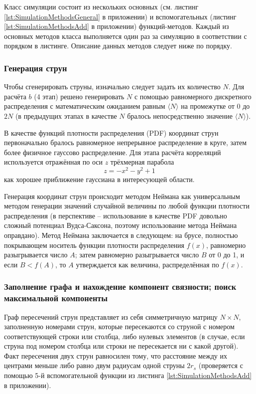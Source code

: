 Класс симуляции состоит из нескольких основных (см. листинг \ref{lst:SimulationMethodsGeneral} в приложении) и вспомогательных (листинг \ref{lst:SimulationMethodsAdd} в приложении) функций-методов. Каждый из основных методов класса выполняется один раз за симуляцию в соответствии с порядком в листинге. Описание данных методов следует ниже по порядку.
\subsubsection{Генерация струн}
Чтобы сгенерировать струны, изначально следует задать их количество $N$. Для расчёта $b$ (4 этап) решено генерировать $N$ с помощью равномерного дискретного распределения с математическим ожиданием равным $\langle N \rangle$ на промежутке от 0 до $2N$ (в предыдущих этапах в качестве $N$ бралось непосредственно значение $\langle N \rangle$). 

В качестве функций плотности распределения (PDF) координат струн первоначально бралось равномерное непрерывное распределение в круге, затем более физичное гауссово распределение. Для этапа расчёта корреляций используется отражённая по оси $z$ трёхмерная парабола
\begin{equation} \label{eq:parabolaPDF}
	z = -x^2 - y^2 + 1
\end{equation}
как хорошее приближение гауссиана в интересующей области. 

Генерация координат струн происходит методом Неймана как универсальным методом генерации значений случайной величины по любой функции плотности распределения (в перспективе -- использование в качестве PDF довольно сложный потенциал Вудса-Саксона, поэтому использование метода Неймана оправдано). Метод Неймана заключается в следующем: на брусе, полностью покрывающем носитель функции плотности распределения $f(x)$, равномерно разыгрывается число $A$; затем равномерно разыгрывается число $B$ от 0 до 1, и если $B < f(A)$, то $A$ утверждается как величина, распределённая по $f(x)$.
\subsubsection{Заполнение графа и нахождение компонент связности; поиск максимальной компоненты}
Граф пересечений струн представляет из себя симметричную матрицу $N \times N$, заполненную номерами струн, которые пересекаются со струной с номером соответствующей строки или столбца, либо нулевых элементов (в случае, если струна под номером столбца или строки не пересекается ни с какой другой). Факт пересечения двух струн равносилен тому, что расстояние между их центрами меньше либо равно двум радиусам одной струны $2r_s$ (проверяется с помощью 5-й вспомогательной функции из листинга \ref{lst:SimulationMethodsAdd} в приложении). 

